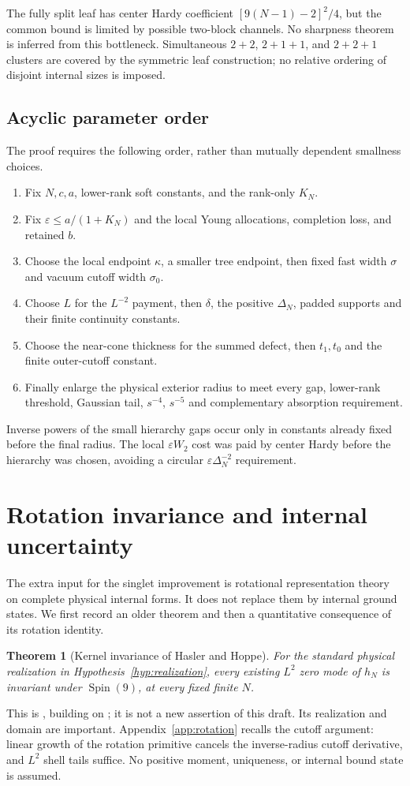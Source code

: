 \documentclass[11pt,letterpaper]{article}
\newtheorem{theorem}{Theorem}[section]
\theoremstyle{definition}\newtheorem{hypothesis}[theorem]{Hypothesis}
\numberwithin{equation}{section}
\begin{document}
The fully split leaf has center Hardy coefficient $[9(N-1)-2]^2/4$, but the common bound is limited by possible two-block channels. No sharpness theorem is inferred from this bottleneck. Simultaneous $2+2$, $2+1+1$, and $2+2+1$ clusters are covered by the symmetric leaf construction; no relative ordering of disjoint internal sizes is imposed.

\subsection{Acyclic parameter order}
The proof requires the following order, rather than mutually dependent smallness choices.
\begin{enumerate}
\item Fix $N,c,a$, lower-rank soft constants, and the rank-only $K_N$.
\item Fix $\varepsilon\le a/(1+K_N)$ and the local Young allocations, completion loss, and retained $b$.
\item Choose the local endpoint $\kappa$, a smaller tree endpoint, then fixed fast width $\sigma$ and vacuum cutoff width $\sigma_0$.
\item Choose $L$ for the $L^{-2}$ payment, then $\delta$, the positive $\Delta_N$, padded supports and their finite continuity constants.
\item Choose the near-cone thickness for the summed defect, then $t_1,t_0$ and the finite outer-cutoff constant.
\item Finally enlarge the physical exterior radius to meet every gap, lower-rank threshold, Gaussian tail, $s^{-4}$, $s^{-5}$ and complementary absorption requirement.
\end{enumerate}
Inverse powers of the small hierarchy gaps occur only in constants already fixed before the final radius. The local $\varepsilon W_2$ cost was paid by center Hardy before the hierarchy was chosen, avoiding a circular $\varepsilon\Delta_N^{-2}$ requirement.

\section{Rotation invariance and internal uncertainty}\label{sec:rotation}
The extra input for the singlet improvement is rotational representation theory on complete physical internal forms. It does not replace them by internal ground states. We first record an older theorem and then a quantitative consequence of its rotation identity.

\begin{theorem}[Kernel invariance of Hasler and Hoppe]\label{thm:invariance}
For the standard physical realization in Hypothesis~\ref{hyp:realization}, every existing $L^2$ zero mode of $h_N$ is invariant under $\operatorname{Spin}(9)$, at every fixed finite $N$.
\end{theorem}
This is \cite[Theorem 1(a), Section 2]{HHI}, building on \cite{SSI}; it is not a new assertion of this draft. Its realization and domain are important. Appendix~\ref{app:rotation} recalls the cutoff argument: linear growth of the rotation primitive cancels the inverse-radius cutoff derivative, and $L^2$ shell tails suffice. No positive moment, uniqueness, or internal bound state is assumed.
\end{document}

